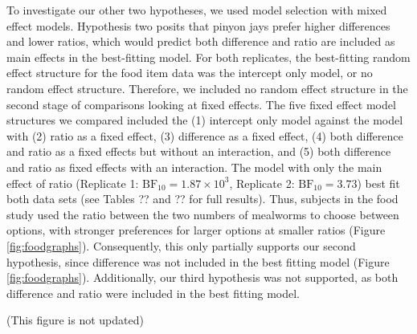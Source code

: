 \documentclass[
  ,doc,floatsintext]{apa6}
\begin{document}
To investigate our other two hypotheses, we used model selection with mixed effect models. Hypothesis two posits that pinyon jays prefer higher differences and lower ratios, which would predict both difference and ratio are included as main effects in the best-fitting model. For both replicates, the best-fitting random effect structure for the food item data was the intercept only model, or no random effect structure. Therefore, we included no random effect structure in the second stage of comparisons looking at fixed effects. The five fixed effect model structures we compared included the (1) intercept only model against the model with (2) ratio as a fixed effect, (3) difference as a fixed effect, (4) both difference and ratio as a fixed effects but without an interaction, and (5) both difference and ratio as fixed effects with an interaction. The model with only the main effect of ratio (Replicate 1: \(\mathrm{BF}_{\textrm{10}} = 1.87 \times 10^{3}\), Replicate 2: \(\mathrm{BF}_{\textrm{10}} = 3.73\)) best fit both data sets (see Tables ?? and ?? for full results). Thus, subjects in the food study used the ratio between the two numbers of mealworms to choose between options, with stronger preferences for larger options at smaller ratios (Figure \ref{fig:foodgraphs}). Consequently, this only partially supports our second hypothesis, since difference was not included in the best fitting model (Figure \ref{fig:foodgraphs}). Additionally, our third hypothesis was not supported, as both difference and ratio were included in the best fitting model.

(This figure is not updated)
\end{document}
